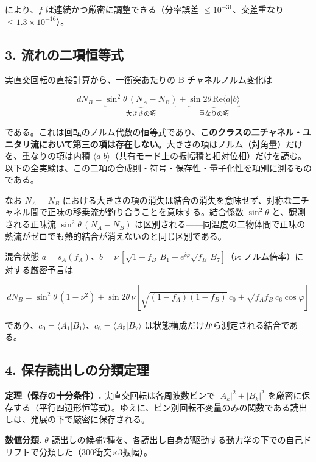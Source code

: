\documentclass[
  a4paper,
]{ltjsarticle}
\begin{document}
により、\(f\) は連続かつ厳密に調整できる（分率誤差
\(\le 10^{-31}\)、交差重なり \(\le 1.3\times10^{-16}\)）。

\subsection{3.
流れの二項恒等式}\label{ux6d41ux308cux306eux4e8cux9805ux6052ux7b49ux5f0f}

実直交回転の直接計算から、一衝突あたりの B チャネルノルム変化は

\[
\boxed{
dN_B
=\underbrace{\sin^2\theta\,(N_A-N_B)}_{\text{大きさの項}}
+\underbrace{\sin 2\theta\,\mathrm{Re}\langle a|b\rangle}_{\text{重なりの項}}
}
\]

である。これは回転のノルム代数の恒等式であり、\textbf{このクラスの二チャネル・ユニタリ流において第三の項は存在しない}。大きさの項はノルム（対角量）だけを、重なりの項は内積
\(\langle a|b\rangle\)（共有モード上の振幅積と相対位相）だけを読む。以下の全実験は、この二項の合成則・符号・保存性・量子化性を項別に測るものである。

なお \(N_A=N_B\)
における大きさの項の消失は結合の消失を意味せず、対称な二チャネル間で正味の移乗流が釣り合うことを意味する。結合係数
\(\sin^2\theta\) と、観測される正味流 \(\sin^2\theta\,(N_A-N_B)\)
は区別される------同温度の二物体間で正味の熱流がゼロでも熱的結合が消えないのと同じ区別である。

混合状態
\(a=s_A(f_A)\)、\(b=\nu\,[\sqrt{1-f_B}\,B_1+e^{i\varphi}\sqrt{f_B}\,B_7]\)（\(\nu\):
ノルム倍率）に対する厳密予言は

\[
dN_B
=\sin^2\theta\,(1-\nu^2)
+\sin2\theta\,\nu\!\left[\sqrt{(1-f_A)(1-f_B)}\,c_0
+\sqrt{f_Af_B}\,c_6\cos\varphi\right]
\]

であり、\(c_0=\langle A_1|B_1\rangle\)、\(c_6=\langle A_5|B_7\rangle\)
は状態構成だけから測定される結合である。

\subsection{4.
保存読出しの分類定理}\label{ux4fddux5b58ux8aadux51faux3057ux306eux5206ux985eux5b9aux7406}

\textbf{定理（保存の十分条件）.} 実直交回転は各周波数ビンで
\(|A_k|^2+|B_k|^2\)
を厳密に保存する（平行四辺形恒等式）。ゆえに、ビン別回転不変量のみの関数である読出しは、発展の下で厳密に保存される。

\textbf{数値分類.} \(\theta\)
読出しの候補7種を、各読出し自身が駆動する動力学の下での自己ドリフトで分類した（300衝突×3振幅）。
\end{document}
